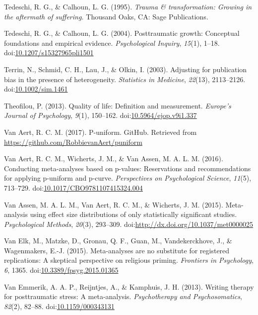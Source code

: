 \documentclass[man, mask]{apa6}
\theoremstyle{definition}
\theoremstyle{definition}
\theoremstyle{definition}
\theoremstyle{remark}
\begin{document}
\hypertarget{ref-Tedeschi1995}{}
Tedeschi, R. G., \& Calhoun, L. G. (1995). \emph{Trauma \&
transformation: Growing in the aftermath of suffering.} Thousand Oaks,
CA: Sage Publications.

\hypertarget{ref-Tedeschi2004}{}
Tedeschi, R. G., \& Calhoun, L. G. (2004). Posttraumatic growth:
Conceptual foundations and empirical evidence. \emph{Psychological
Inquiry}, \emph{15}(1), 1--18.
doi:\href{https://doi.org/10.1207/s15327965pli1501}{10.1207/s15327965pli1501}

\hypertarget{ref-Terrin2003}{}
Terrin, N., Schmid, C. H., Lau, J., \& Olkin, I. (2003). Adjusting for
publication bias in the presence of heterogeneity. \emph{Statistics in
Medicine}, \emph{22}(13), 2113--2126.
doi:\href{https://doi.org/10.1002/sim.1461}{10.1002/sim.1461}

\hypertarget{ref-Theofilou2013}{}
Theofilou, P. (2013). Quality of life: Definition and measurement.
\emph{Europe's Journal of Psychology}, \emph{9}(1), 150--162.
doi:\href{https://doi.org/10.5964/ejop.v9i1.337}{10.5964/ejop.v9i1.337}

\hypertarget{ref-VanAert2017}{}
Van Aert, R. C. M. (2017). P-uniform. GitHub. Retrieved from
\url{https://github.com/RobbievanAert/puniform}

\hypertarget{ref-VanAert2016}{}
Van Aert, R. C. M., Wicherts, J. M., \& Van Assen, M. A. L. M. (2016).
Conducting meta-analyses based on p-values: Reservations and
recommendations for applying p-uniform and p-curve. \emph{Perspectives
on Psychological Science}, \emph{11}(5), 713--729.
doi:\href{https://doi.org/10.1017/CBO9781107415324.004}{10.1017/CBO9781107415324.004}

\hypertarget{ref-VanAssen2015}{}
Van Assen, M. A. L. M., Van Aert, R. C. M., \& Wicherts, J. M. (2015).
Meta-analysis using effect size distributions of only statistically
significant studies. \emph{Psychological Methods}, \emph{20}(3),
293--309.
doi:\href{https://doi.org/http://dx.doi.org/10.1037/met0000025}{http://dx.doi.org/10.1037/met0000025}

\hypertarget{ref-VanElk2015}{}
Van Elk, M., Matzke, D., Gronau, Q. F., Guan, M., Vandekerckhove, J., \&
Wagenmakers, E.-J. (2015). Meta-analyses are no substitute for
registered replications: A skeptical perspective on religious priming.
\emph{Frontiers in Psychology}, \emph{6}, 1365.
doi:\href{https://doi.org/10.3389/fpsyg.2015.01365}{10.3389/fpsyg.2015.01365}

\hypertarget{ref-VanEmmerik2013}{}
Van Emmerik, A. A. P., Reijntjes, A., \& Kamphuis, J. H. (2013). Writing
therapy for posttraumatic stress: A meta-analysis. \emph{Psychotherapy
and Psychosomatics}, \emph{82}(2), 82--88.
doi:\href{https://doi.org/10.1159/000343131}{10.1159/000343131}
\end{document}
